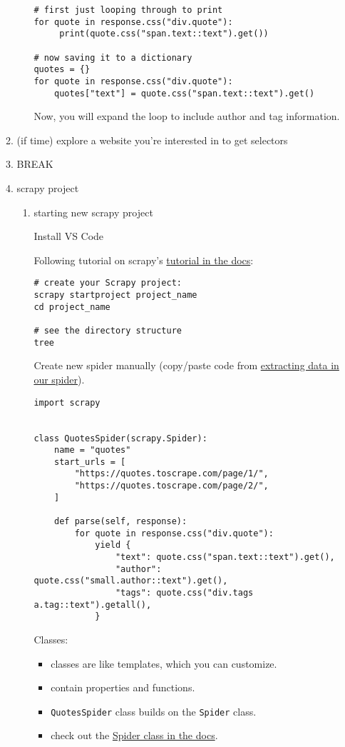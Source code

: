 \documentclass[11pt]{article}
\begin{document}
\begin{enumerate}
\begin{enumerate}
\begin{enumerate}
\begin{verbatim}
# first just looping through to print
for quote in response.css("div.quote"):
     print(quote.css("span.text::text").get())

# now saving it to a dictionary   
quotes = {}
for quote in response.css("div.quote"):
    quotes["text"] = quote.css("span.text::text").get()
\end{verbatim}

Now, you will expand the loop to include author and tag information.
\end{enumerate}

\item (if time) explore a website you're interested in to get selectors
\label{sec:orge3dfa1b}
\item BREAK
\label{sec:orgcd69d45}
\item scrapy project
\label{sec:orga6f3566}
\begin{enumerate}
\item starting new scrapy project
\label{sec:org6895ff8}

Install VS Code

Following tutorial on scrapy's \href{https://docs.scrapy.org/en/latest/intro/tutorial.html}{tutorial in the docs}:

\begin{verbatim}
# create your Scrapy project:
scrapy startproject project_name
cd project_name

# see the directory structure
tree
\end{verbatim}

Create new spider manually (copy/paste code from \href{https://docs.scrapy.org/en/latest/intro/tutorial.html\#extracting-data-in-our-spider}{extracting data in
our spider}). 

\begin{verbatim}
import scrapy


class QuotesSpider(scrapy.Spider):
    name = "quotes"
    start_urls = [
        "https://quotes.toscrape.com/page/1/",
        "https://quotes.toscrape.com/page/2/",
    ]

    def parse(self, response):
        for quote in response.css("div.quote"):
            yield {
                "text": quote.css("span.text::text").get(),
                "author": quote.css("small.author::text").get(),
                "tags": quote.css("div.tags a.tag::text").getall(),
            }
\end{verbatim}

Classes:
\begin{itemize}
\item classes are like templates, which you can customize.
\item contain properties and functions.
\item \texttt{QuotesSpider} class builds on the \texttt{Spider} class.
\item check out the \href{https://docs.scrapy.org/en/latest/topics/spiders.html}{Spider class in the docs}.
\end{itemize}


\end{enumerate}
\end{enumerate}
\end{enumerate}
\end{document}
